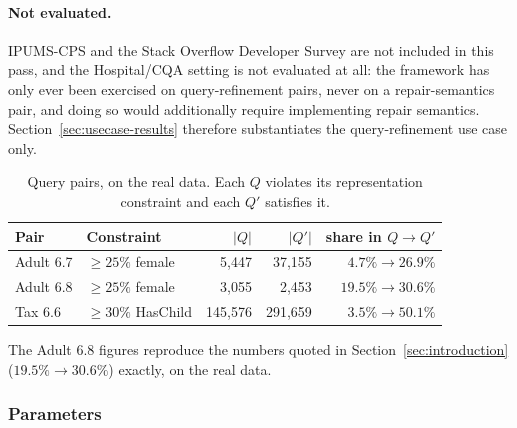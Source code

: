 \paragraph{Not evaluated.}
IPUMS-CPS and the Stack Overflow Developer Survey are not included in this pass, and the Hospital/CQA setting is not evaluated at all: the framework has only ever been exercised on query-refinement pairs, never on a repair-semantics pair, and doing so would additionally require implementing repair semantics.
Section~\ref{sec:usecase-results} therefore substantiates the query-refinement use case only.

\begin{table}[t]
\centering
\small
\caption{Query pairs, on the real data. Each $Q$ violates its representation constraint and each $Q'$ satisfies it.}
\label{tab:query-pairs}
\begin{tabular}{@{}llrrr@{}}
\toprule
Pair & Constraint & $|Q|$ & $|Q'|$ & share in $Q\rightarrow Q'$ \\
\midrule
Adult 6.7  & $\ge25\%$ female   & 5{,}447  & 37{,}155  & $4.7\%\rightarrow26.9\%$ \\
Adult 6.8  & $\ge25\%$ female   & 3{,}055  & 2{,}453   & $19.5\%\rightarrow30.6\%$ \\
Tax 6.6    & $\ge30\%$ HasChild & 145{,}576 & 291{,}659 & $3.5\%\rightarrow50.1\%$ \\
\bottomrule
\end{tabular}
\end{table}

The Adult 6.8 figures reproduce the numbers quoted in Section~\ref{sec:introduction} ($19.5\%\rightarrow30.6\%$) exactly, on the real data.

\subsubsection{Parameters}
\label{subsubsec:parameters}

